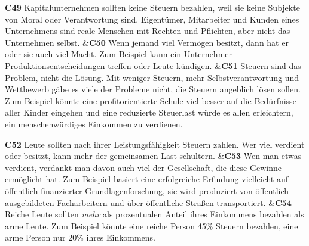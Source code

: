\documentclass[
		11pt,
		a4paper,
		openright,
		oneside,
		ngerman
	]
	{book}
\begin{document}
\begin{longtabu}[htpb]
\textbf{C49} %
		Kapitalunternehmen sollten keine Steuern bezahlen, weil sie keine Subjekte von Moral oder Verantwortung sind.
		Eigentümer, Mitarbeiter und Kunden eines Unternehmens sind reale Menschen mit Rechten und Pflichten, aber nicht das Unternehmen selbst.
&\textbf{C50}
		Wenn jemand viel Vermögen besitzt, dann hat er oder sie auch viel Macht.
		Zum Beispiel kann ein Unternehmer Produktionsentscheidungen treffen oder Leute kündigen.
&\textbf{C51} %
		Steuern sind das Problem, nicht die Lösung.
		Mit weniger Steuern, mehr Selbstverantwortung und Wettbewerb gäbe es viele der Probleme nicht, die Steuern angeblich lösen sollen.
		Zum Beispiel könnte eine profitorientierte Schule viel besser auf die Bedürfnisse aller Kinder eingehen und eine reduzierte Steuerlast würde es allen erleichtern, ein menschenwürdiges Einkommen zu verdienen.
\\

\midrule

\textbf{C52} %
		Leute sollten nach ihrer Leistungsfähigkeit Steuern zahlen.
		Wer viel verdient oder besitzt, kann mehr der gemeinsamen Last schultern.
&\textbf{C53} %
		Wen man etwas verdient, verdankt man davon auch viel der Gesellschaft, die diese Gewinne ermöglicht hat.
		Zum Beispiel basiert eine erfolgreiche Erfindung vielleicht auf öffentlich finanzierter Grundlagenforschung, sie wird produziert von öffentlich ausgebildeten Facharbeitern und über öffentliche Straßen transportiert.
&\textbf{C54} %
		Reiche Leute sollten \emph{mehr} als prozentualen Anteil ihres Einkommens bezahlen als arme Leute.
		Zum Beispiel könnte eine reiche Person 45\% Steuern bezahlen, eine arme Person nur 20\% ihres Einkommens.
\\


\end{longtabu}
\end{document}

